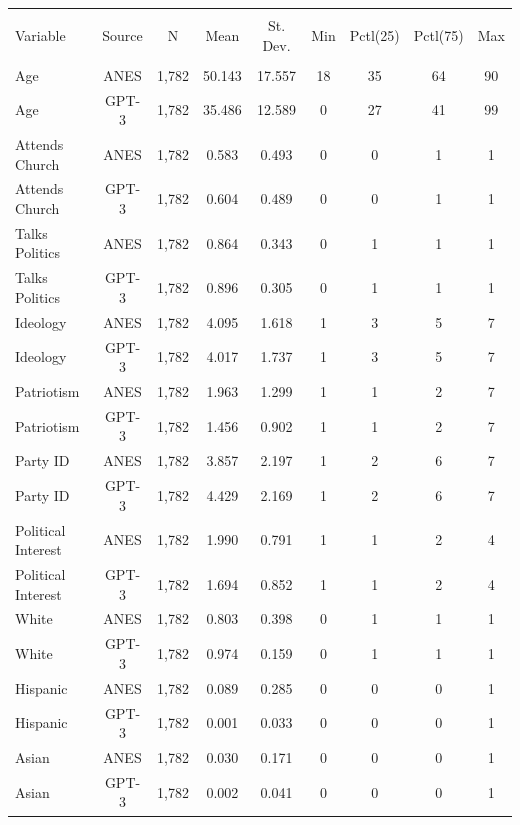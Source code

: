 \documentclass[11pt]{article}
\begin{document}
\begin{table}[!htbp] \centering
\renewcommand{\arraystretch}{0.9}
\begin{tabular}{@{\extracolsep{5pt}}lcccccccc}
\\[-1.8ex]\hline \\[-1.8ex]
Variable & Source & \multicolumn{1}{c}{N} & \multicolumn{1}{c}{Mean} & \multicolumn{1}{c}{St. Dev.} & \multicolumn{1}{c}{Min} & \multicolumn{1}{c}{Pctl(25)} & \multicolumn{1}{c}{Pctl(75)} & \multicolumn{1}{c}{Max} \\
\hline \\[-1.8ex]
Age & ANES & 1,782 & 50.143 & 17.557 & 18 & 35 & 64 & 90 \\
Age & GPT-3 & 1,782 & 35.486 & 12.589 & 0 & 27 & 41 & 99 \\
Attends Church & ANES & 1,782 & 0.583 & 0.493 & 0 & 0 & 1 & 1 \\
Attends Church & GPT-3 & 1,782 & 0.604 & 0.489 & 0 & 0 & 1 & 1 \\
Talks Politics & ANES  & 1,782 & 0.864 & 0.343 & 0 & 1 & 1 & 1 \\
Talks Politics & GPT-3 & 1,782 & 0.896 & 0.305 & 0 & 1 & 1 & 1 \\
Ideology & ANES  & 1,782 & 4.095 & 1.618 & 1 & 3 & 5 & 7 \\
Ideology & GPT-3 & 1,782 & 4.017 & 1.737 & 1 & 3 & 5 & 7 \\
Patriotism & ANES & 1,782 & 1.963 & 1.299 & 1 & 1 & 2 & 7 \\
Patriotism & GPT-3 & 1,782 & 1.456 & 0.902 & 1 & 1 & 2 & 7 \\
Party ID & ANES  & 1,782 & 3.857 & 2.197 & 1 & 2 & 6 & 7 \\
Party ID & GPT-3 & 1,782 & 4.429 & 2.169 & 1 & 2 & 6 & 7 \\
Political Interest & ANES & 1,782 & 1.990 & 0.791 & 1 & 1 & 2 & 4 \\
Political Interest & GPT-3 & 1,782 & 1.694 & 0.852 & 1 & 1 & 2 & 4 \\
White & ANES  & 1,782 & 0.803 & 0.398 & 0 & 1 & 1 & 1 \\
White & GPT-3 & 1,782 & 0.974 & 0.159 & 0 & 1 & 1 & 1 \\
Hispanic & ANES  & 1,782 & 0.089 & 0.285 & 0 & 0 & 0 & 1 \\
Hispanic & GPT-3 & 1,782 & 0.001 & 0.033 & 0 & 0 & 0 & 1 \\
Asian & ANES & 1,782 & 0.030 & 0.171 & 0 & 0 & 0 & 1 \\
Asian & GPT-3 & 1,782 & 0.002 & 0.041 & 0 & 0 & 0 & 1 \\

\end{tabular}
\end{table}
\end{document}
